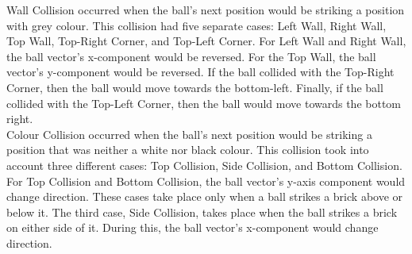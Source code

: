 \documentclass{article}
\begin{document}
Wall Collision occurred when the ball's next position would be striking a position with grey colour. This collision had five separate cases: Left Wall, Right Wall, Top Wall, Top-Right Corner, and Top-Left Corner. For Left Wall and Right Wall, the ball vector's x-component would be reversed. For the Top Wall, the ball vector's y-component would be reversed. If the ball collided with the Top-Right Corner, then the ball would move towards the bottom-left. Finally, if the ball collided with the Top-Left Corner, then the ball would move towards the bottom right. \\

Colour Collision occurred when the ball's next position would be striking a position that was neither a white nor black colour. This collision took into account three different cases: Top Collision, Side Collision, and Bottom Collision. For Top Collision and Bottom Collision, the ball vector's y-axis component would change direction. These cases take place only when a ball strikes a brick above or below it. The third case, Side Collision, takes place when the ball strikes a brick on either side of it. During this, the ball vector's x-component would change direction. 
\end{document}
